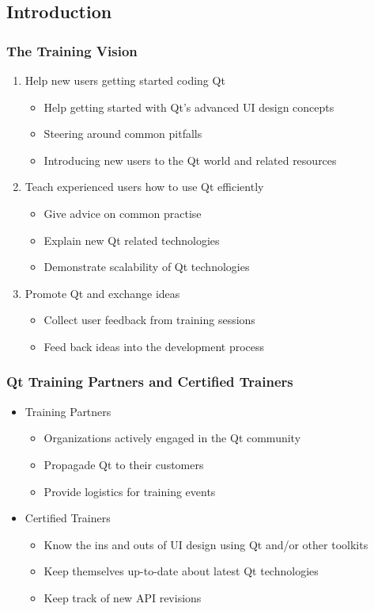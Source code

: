 \subsection{Introduction}

\begin{slide}
  \frametitle{The Training Vision}
  \begin{enumerate}
    \item Help new users getting started coding Qt
    \begin{itemize}
      \item Help getting started with Qt's advanced UI design concepts
      \item Steering around common pitfalls
      \item Introducing new users to the Qt world and related resources
    \end{itemize}
    \item Teach experienced users how to use Qt efficiently
    \begin{itemize}
      \item Give advice on common practise
      \item Explain new Qt related technologies
      \item Demonstrate scalability of Qt technologies
    \end{itemize}
    \item Promote Qt and exchange ideas
    \begin{itemize}
      \item Collect user feedback from training sessions
      \item Feed back ideas into the development process
    \end{itemize}
  \end{enumerate}
\end{slide}

\begin{slide}
  \frametitle{Qt Training Partners and Certified Trainers}
  \begin{itemize}
    \item Training Partners
    \begin{itemize}
      \item Organizations actively engaged in the Qt community
      \item Propagade Qt to their customers
      \item Provide logistics for training events
    \end{itemize}
    \item Certified Trainers
    \begin{itemize}
      \item Know the ins and outs of UI design using Qt and/or other toolkits
      \item Keep themselves up-to-date about latest Qt technologies
      \item Keep track of new API revisions
    \end{itemize}
  \end{itemize}
\end{slide}

